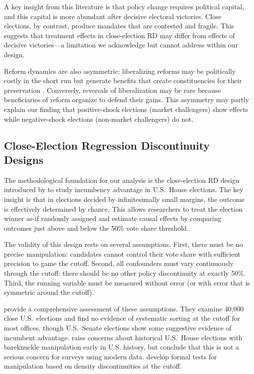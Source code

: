 \documentclass[12pt,a4paper]{article}
\begin{document}
A key insight from this literature is that policy change requires political 
capital, and this capital is more abundant after decisive electoral 
victories. Close elections, by contrast, produce mandates that are 
contested and fragile. This suggests that treatment effects in close-election 
RD may differ from effects of decisive victories---a limitation we 
acknowledge but cannot address within our design.

Reform dynamics are also asymmetric: liberalizing reforms may be politically 
costly in the short run but generate benefits that create constituencies 
for their preservation \citep{fernandez1991resistance}. Conversely, 
reversals of liberalization may be rare because beneficiaries of reform 
organize to defend their gains. This asymmetry may partly explain our 
finding that positive-shock elections (market challengers) show effects 
while negative-shock elections (non-market challengers) do not.

\subsection{Close-Election Regression Discontinuity Designs}

The methodological foundation for our analysis is the close-election RD 
design introduced by \citet{lee2008randomized} to study incumbency advantage 
in U.S.\ House elections. The key insight is that in elections decided 
by infinitesimally small margins, the outcome is effectively determined 
by chance. This allows researchers to treat the election winner as-if 
randomly assigned and estimate causal effects by comparing outcomes just 
above and below the 50\% vote share threshold.

The validity of this design rests on several assumptions. First, there 
must be no precise manipulation: candidates cannot control their vote 
share with sufficient precision to game the cutoff. Second, all 
confounders must vary continuously through the cutoff: there should be 
no other policy discontinuity at exactly 50\%. Third, the running 
variable must be measured without error (or with error that is symmetric 
around the cutoff).

\citet{eggers2015validity} provide a comprehensive assessment of these 
assumptions. They examine 40,000 close U.S.\ elections and find no 
evidence of systematic sorting at the cutoff for most offices, though 
U.S.\ Senate elections show some suggestive evidence of incumbent 
advantage. \citet{caughey2011elections} raise concerns about historical 
U.S.\ House elections with bareknuckle manipulation early in U.S. history, 
but conclude that this is not a serious concern for surveys using modern 
data. \citet{cattaneo2015randomization} develop formal 
tests for manipulation based on density discontinuities at the cutoff.
\end{document}
